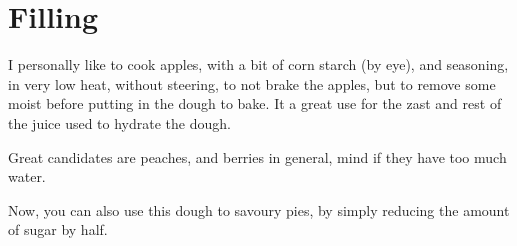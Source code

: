 \section{Filling}

I personally like to cook apples, with a bit of corn starch (by eye), and seasoning, in very low heat, without steering, to not brake the apples, but to remove some moist before putting in the dough to bake.
%
It a great use for the zast and rest of the juice used to hydrate the dough.

Great candidates are peaches, and berries in general, mind if they have too much water.

Now, you can also use this dough to savoury pies, by simply reducing the amount of sugar by half.
